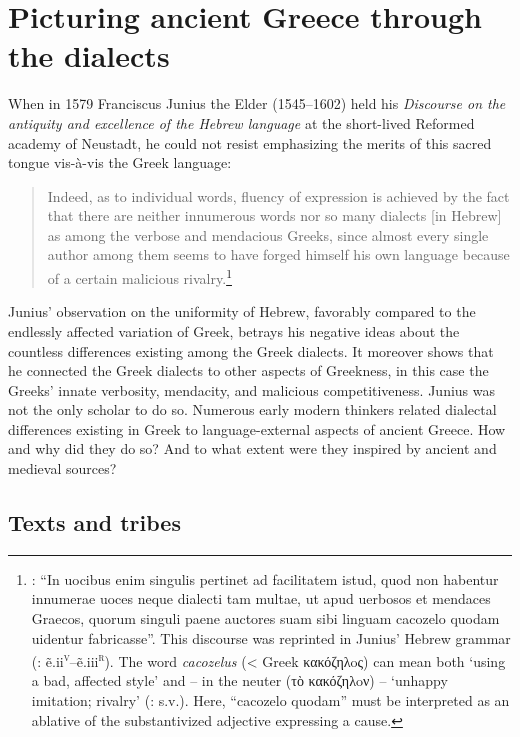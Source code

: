 \chapter{Picturing ancient Greece through the dialects}\label{chap:7}

When in 1579 Franciscus Junius the Elder (1545–1602) held his \textit{Discourse on the antiquity and excellence of the Hebrew language} at the short-lived Reformed academy of Neustadt, he could not resist emphasizing the merits of this sacred tongue vis-à-vis the Greek language:

\begin{quote}
Indeed, as to individual words, fluency of expression is achieved by the fact that there are neither innumerous words nor so many dialects [in Hebrew] as among the verbose and mendacious Greeks, since almost every single author among them seems to have forged himself his own language because of a certain malicious rivalry.\footnote{\citet[\textsc{b.3}\textsc{\textsuperscript{v}}]{Junius1579}: “In uocibus enim singulis pertinet ad facilitatem istud, quod non habentur innumerae uoces neque dialecti tam multae, ut apud uerbosos et mendaces Graecos, quorum singuli paene auctores suam sibi linguam cacozelo quodam uidentur fabricasse”. This discourse was reprinted in Junius’ Hebrew grammar (\citealt{Junius1580}: ẽ.ii\textsc{\textsuperscript{v}}–ẽ.iii\textsc{\textsuperscript{r}}). The word \textit{cacozelus} (< Greek κακόζηλoς) can mean both ‘using a bad, affected style’ and – in the neuter (τὸ κακόζηλoν) – ‘unhappy imitation; rivalry’ (\citealt{LiddellScott1940}: s.v.). Here, “cacozelo quodam” must be interpreted as an ablative of the substantivized adjective expressing a cause.}
\end{quote}

Junius’ observation on the uniformity of Hebrew, favorably compared to the endlessly affected variation of Greek, betrays his negative ideas about the countless differences existing among the Greek dialects. It moreover shows that he connected the Greek dialects to other aspects of Greekness, in this case the Greeks’ innate verbosity, mendacity, and malicious competitiveness. Junius was not the only scholar to do so. Numerous early modern thinkers related dialectal differences existing in Greek to language-external aspects of ancient Greece. How and why did they do so? And to what extent were they inspired by ancient and medieval sources?

\section{Texts and tribes}\label{sec:7.1}

